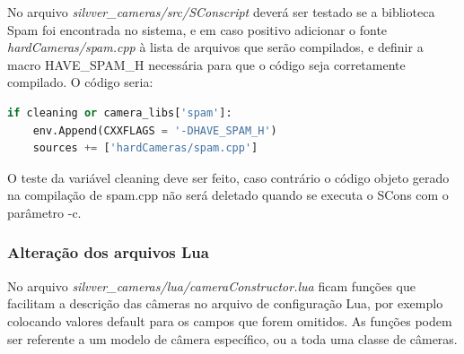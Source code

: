 \documentclass[a4paper,10pt]{article}
\begin{document}
No arquivo \emph{silvver\_cameras/src/SConscript} deverá ser testado se a
biblioteca Spam foi encontrada no sistema, e em caso positivo adicionar o
fonte \emph{hardCameras/spam.cpp} à lista de arquivos que serão compilados, e
definir a macro HAVE\_SPAM\_H necessária para que o código seja corretamente
compilado. O código seria:
\begin{lstlisting}[frame=lines,language=python]
if cleaning or camera_libs['spam']:
    env.Append(CXXFLAGS = '-DHAVE_SPAM_H')
    sources += ['hardCameras/spam.cpp']
\end{lstlisting}
O teste da variável cleaning deve ser feito, caso contrário o código objeto
gerado na compilação de spam.cpp não será deletado quando se executa o SCons
com o parâmetro -c.

\subsubsection{Alteração dos arquivos Lua}
No arquivo \emph{silvver\_cameras/lua/cameraConstructor.lua} ficam funções que
facilitam a descrição das câmeras no arquivo de configuração Lua, por exemplo
colocando valores default para os campos que forem omitidos. As funções podem
ser referente a um modelo de câmera específico, ou a toda uma classe de
câmeras.




\end{document}
